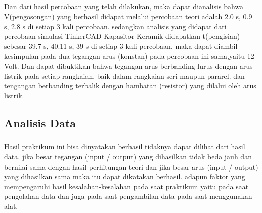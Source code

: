 \documentclass[12pt,a4paper]{article}
\begin{document}
\subparagraph{ }
	Dan dari hasil percobaan yang telah dilakukan, maka dapat dianalisis bahwa V(pengosongan) yang berhasil didapat melalui percobaan teori adalah 2.0 s, 0.9 s, 2.8 s di setiap 3 kali percobaan. sedangkan analisis yang didapat dari percobaan simulasi TinkerCAD Kapasitor Keramik didapatkan t(pengisian) sebesar 39.7 s, 40.11 s, 39 s di setiap 3 kali percobaan. maka dapat diambil kesimpulan pada dua tegangan arus (konstan) pada percobaan ini sama,yaitu 12 Volt. Dan dapat dibuktikan bahwa tegangan arus berbanding lurus dengan arus listrik pada setiap rangkaian. baik dalam rangkaian seri maupun pararel. dan tengangan berbanding terbalik dengan hambatan (resistor) yang dilalui oleh arus listrik.

\newpage
\subsection{Analisis Data}
\subparagraph{}
	Hasil praktikum ini bisa dinyatakan berhasil tidaknya dapat dilihat dari hasil data, jika besar tegangan (input / output) yang dihasilkan tidak beda jauh dan bernilai sama dengan hasil perhitungan teori dan jika besar arus (input / output) yang dihasilkan sama maka itu dapat dikatakan berhasil. adapun faktor yang mempengaruhi hasil kesalahan-kesalahan pada saat praktikum yaitu pada saat pengolahan data dan juga pada saat pengambilan data pada saat menggunakan alat.

\newpage
\end{document}
